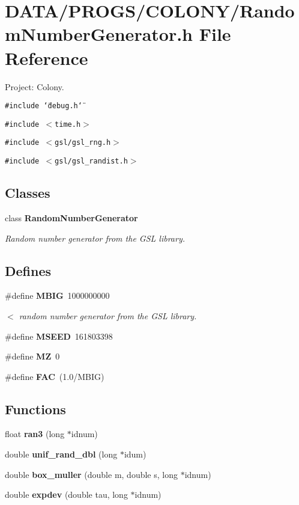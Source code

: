 \section{DATA/PROGS/COLONY/RandomNumberGenerator.h File Reference}
\label{RandomNumberGenerator_8h}
Project: Colony. 

{\tt \#include \char`\"{}debug.h\char`\"{}}\par
{\tt \#include $<$time.h$>$}\par
{\tt \#include $<$gsl/gsl\_\-rng.h$>$}\par
{\tt \#include $<$gsl/gsl\_\-randist.h$>$}\par
\subsection*{Classes}
\begin{CompactItemize}
\item 
class {\bf RandomNumberGenerator}
\begin{CompactList}\small\item\em Random number generator from the GSL library. \item\end{CompactList}\end{CompactItemize}
\subsection*{Defines}
\begin{CompactItemize}
\item 
\#define {\bf MBIG}~1000000000
\begin{CompactList}\small\item\em $<$ random number generator from the GSL library. \item\end{CompactList}\item 
\#define {\bf MSEED}~161803398
\item 
\#define {\bf MZ}~0
\item 
\#define {\bf FAC}~(1.0/MBIG)
\end{CompactItemize}
\subsection*{Functions}
\begin{CompactItemize}
\item 
float {\bf ran3} (long $\ast$idnum)
\item 
double {\bf unif\_\-rand\_\-dbl} (long $\ast$idum)
\item 
double {\bf box\_\-muller} (double m, double s, long $\ast$idnum)
\item 
double {\bf expdev} (double tau, long $\ast$idnum)
\end{CompactItemize}


